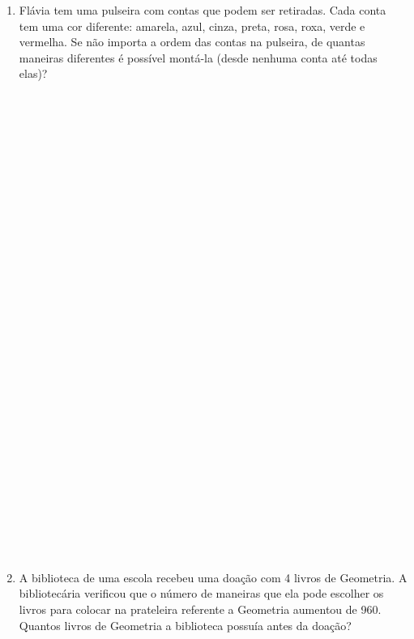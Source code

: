 \documentclass[a4paper,14pt]{article}
\begin{document}
\begin{multicols}{2}
\begin{enumerate}
   			\item Flávia tem uma pulseira com contas que podem ser retiradas. Cada conta tem uma cor diferente: amarela, azul, cinza, preta, rosa, roxa, verde e vermelha. Se não importa a ordem das contas na pulseira, de quantas maneiras diferentes é possível montá-la (desde nenhuma conta até todas elas)? \\\\\\\\\\\\\\\\\\\\\\\\\\\\\\\\\\\\\\\\\\\\\\\\\\\\\\\\\\\\\\
   			\item A biblioteca de uma escola recebeu uma doação com 4 livros de Geometria. A bibliotecária verificou que o número de maneiras que ela pode escolher os livros para colocar na prateleira referente a Geometria aumentou de 960. Quantos livros de Geometria a biblioteca possuía antes da doação?
   		\end{enumerate}

\end{multicols}
\end{document}
